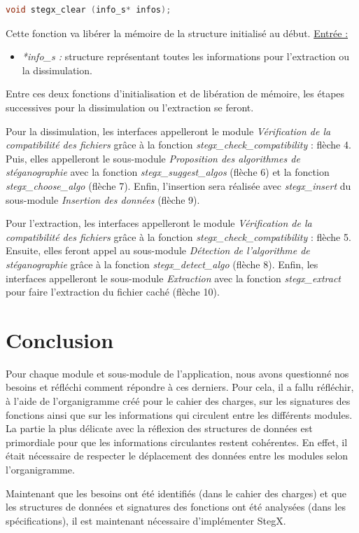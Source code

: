 \documentclass[11pt]{article}
\begin{document}
\begin{lstlisting}[language=c]
void stegx_clear (info_s* infos);
\end{lstlisting}

Cette fonction va libérer la mémoire de la structure initialisé au début. 
\newline
\underline{Entrée :} 
\begin{itemize}
\item \textit{*info\_s :} structure représentant toutes les informations 
pour l'extraction ou la dissimulation. 
\end{itemize} 

Entre ces deux fonctions d'initialisation et de libération de mémoire, 
les étapes successives pour la dissimulation ou l'extraction se feront. 

Pour la dissimulation, les interfaces appelleront le module 
\textit{Vérification de la compatibilité des fichiers} grâce à la fonction 
\textit{stegx\_check\_compatibility} : flèche 4. 
Puis, elles appelleront le sous-module 
\textit{Proposition des algorithmes de stéganographie} avec la fonction 
\textit{stegx\_suggest\_algos} (flèche 6) et la fonction 
\textit{stegx\_choose\_algo} (flèche 7). 
Enfin, l'insertion sera réalisée avec \textit{stegx\_insert} du sous-module 
\textit{Insertion des données} (flèche 9). 

Pour l'extraction, les interfaces appelleront le module 
\textit{Vérification de la compatibilité des fichiers} grâce à la fonction 
\textit{stegx\_check\_compatibility} : flèche 5. 
Ensuite, elles feront appel au sous-module 
\textit{Détection de l'algorithme de stéganographie} grâce à la fonction 
\textit{stegx\_detect\_algo} (flèche 8).
Enfin, les interfaces appelleront le sous-module \textit{Extraction} avec la 
fonction \textit{stegx\_extract} pour faire l'extraction du fichier caché 
(flèche 10). 

\section{Conclusion}

Pour chaque module et sous-module de l'application, nous avons questionné nos 
besoins et réfléchi comment répondre à ces derniers. Pour cela, il a fallu 
réfléchir, à l'aide de l'organigramme créé pour le cahier des charges, 
sur les signatures des fonctions ainsi que sur les informations qui circulent 
entre les différents modules. 
La partie la plus délicate avec la réflexion des structures de données 
est primordiale pour que les informations circulantes restent cohérentes. 
En effet, il était nécessaire de respecter le déplacement des données entre 
les modules selon l'organigramme. 

Maintenant que les besoins ont été identifiés (dans le cahier des charges) 
et que les structures de données et signatures des fonctions ont été 
analysées (dans les spécifications), il est maintenant nécessaire 
d'implémenter StegX. 
\end{document}
